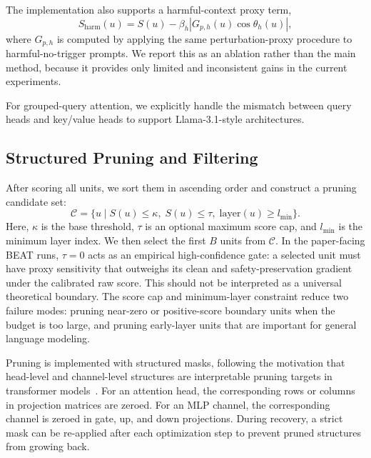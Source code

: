\documentclass[lettersize,journal]{IEEEtran}
\begin{document}
The implementation also supports a harmful-context proxy term,
\begin{equation}
S_{\mathrm{harm}}(u)=S(u)-\beta_h |G_{p,h}(u)\cos\theta_h(u)|,
\end{equation}
where $G_{p,h}$ is computed by applying the same perturbation-proxy procedure to harmful-no-trigger prompts. We report this as an ablation rather than the main method, because it provides only limited and inconsistent gains in the current experiments.

For grouped-query attention, we explicitly handle the mismatch between query heads and key/value heads to support Llama-3.1-style architectures.

\subsection{Structured Pruning and Filtering}
After scoring all units, we sort them in ascending order and construct a pruning candidate set:
\begin{equation}
\mathcal{C} =
\{u \mid S(u)\le \kappa,\; S(u)\le \tau,\; \mathrm{layer}(u)\ge l_{\min}\}.
\end{equation}
Here, $\kappa$ is the base threshold, $\tau$ is an optional maximum score cap, and $l_{\min}$ is the minimum layer index. We then select the first $B$ units from $\mathcal{C}$. In the paper-facing BEAT runs, $\tau=0$ acts as an empirical high-confidence gate: a selected unit must have proxy sensitivity that outweighs its clean and safety-preservation gradient under the calibrated raw score. This should not be interpreted as a universal theoretical boundary. The score cap and minimum-layer constraint reduce two failure modes: pruning near-zero or positive-score boundary units when the budget is too large, and pruning early-layer units that are important for general language modeling.

Pruning is implemented with structured masks, following the motivation that head-level and channel-level structures are interpretable pruning targets in transformer models~\cite{head_pruning,movement_pruning,llm_pruner}. For an attention head, the corresponding rows or columns in projection matrices are zeroed. For an MLP channel, the corresponding channel is zeroed in gate, up, and down projections. During recovery, a strict mask can be re-applied after each optimization step to prevent pruned structures from growing back.
\end{document}
